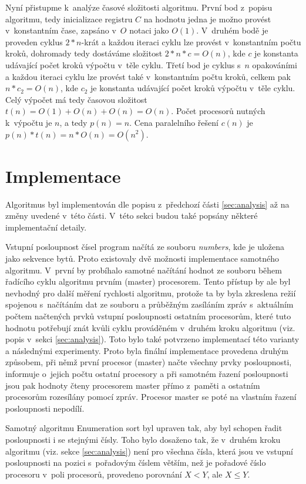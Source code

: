 \documentclass[a4paper, 12pt]{article}
\begin{document}
Nyní přistupme k~analýze časové složitosti algoritmu.
První bod z~popisu algoritmu, tedy inicializace registru $C$ na hodnotu jedna je možno provést v~konstantním čase,
zapsáno v~$O$ notaci jako $O(1)$.
V~druhém bodě je proveden cyklus $2*n$-krát a každou iteraci cyklu lze provést v~konstantním počtu kroků, dohromady tedy
dostáváme složitost $2*n*c=O(n)$, kde $c$ je konstanta udávající počet kroků výpočtu v~těle cyklu.
Třetí bod je cyklus s~$n$ opakováními a každou iteraci cyklu lze provést také v~konstantním počtu kroků, celkem pak $n*c_2=O(n)$,
kde $c_2$ je konstanta udávající počet kroků výpočtu v~těle cyklu.
Celý výpočet má tedy časovou složitost $t(n)=O(1)+O(n)+O(n)=O(n)$.
Počet procesorů nutných k~výpočtu je $n$, a tedy $p(n)=n$.
Cena paralelního řešení $c(n)$ je $p(n)*t(n)=n*O(n)=O(n^2)$.


\section{Implementace}
\label{sec:impl}
Algoritmus byl implementován dle popisu z~předchozí části \ref{sec:analysis} až na změny uvedené v~této části.
V~této sekci budou také popsány některé implementační detaily.

Vstupní posloupnost čísel program načítá ze souboru \emph{numbers}, kde je uložena jako sekvence bytů.
Proto existovaly dvě možnosti implementace samotného algoritmu.
V~první by probíhalo samotné načítání hodnot ze souboru během řadícího cyklu algoritmu prvním (master) procesorem.
Tento přístup by ale byl nevhodný pro další měření rychlosti algoritmu, protože ta by byla
zkreslena režií spojenou s~načítáním dat ze souboru a průběžným zasíláním zpráv s~aktuálním počtem načtených prvků
vstupní posloupnosti ostatním procesorům, které tuto hodnotu potřebují znát kvůli cyklu prováděném v~druhém kroku algoritmu
(viz. popis v~sekci \ref{sec:analysis}).
Toto bylo také potvrzeno implementací této varianty a následnými experimenty.
Proto byla finální implementace provedena druhým způsobem, při němž první procesor (master) načte všechny prvky posloupnosti,
informuje o~jejich počtu ostatní procesory a při samotném řazení posloupnosti jsou pak hodnoty čteny procesorem master přímo z~paměti
a ostatním procesorům rozesílány pomocí zpráv.
Procesor master se poté na vlastním řazení posloupnosti nepodílí.

Samotný algoritmu Enumeration sort byl upraven tak, aby byl schopen řadit posloupnosti i se stejnými čísly.
Toho bylo dosaženo tak, že v~druhém kroku algoritmu (viz. sekce \ref{sec:analysis}) není
pro všechna čísla, která jsou ve vstupní posloupnosti na pozici s~pořadovým
číslem větším, než je pořadové číslo procesoru v~poli procesorů,
provedeno porovnání $X<Y$, ale $X \leq Y$.
\end{document}
